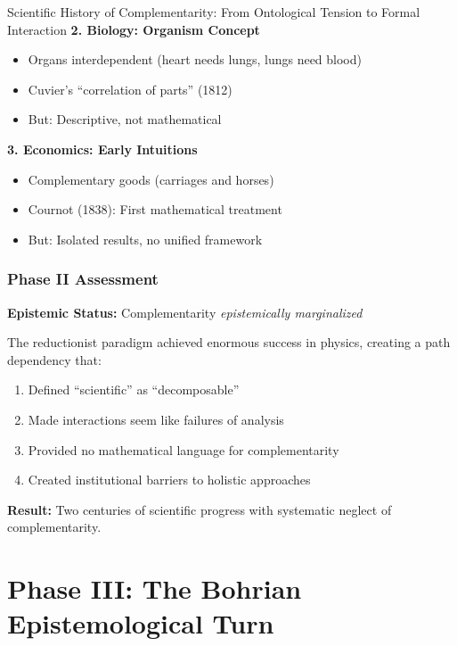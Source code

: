 \begin{chapter}{Scientific History of Complementarity: From Ontological Tension to Formal Interaction}
\textbf{2. Biology: Organism Concept}
\begin{itemize}[noitemsep]
    \item Organs interdependent (heart needs lungs, lungs need blood)
    \item Cuvier's ``correlation of parts'' (1812)
    \item But: Descriptive, not mathematical
\end{itemize}

\textbf{3. Economics: Early Intuitions}
\begin{itemize}[noitemsep]
    \item Complementary goods (carriages and horses)
    \item Cournot (1838): First mathematical treatment
    \item But: Isolated results, no unified framework
\end{itemize}

\subsubsection{Phase II Assessment}

\begin{tcolorbox}[colback=red!5!white,colframe=red!75!black,title=\textbf{Phase II Verdict}]
\textbf{Epistemic Status:} Complementarity \textit{epistemically marginalized}

The reductionist paradigm achieved enormous success in physics, creating a path dependency that:
\begin{enumerate}[noitemsep]
    \item Defined ``scientific'' as ``decomposable''
    \item Made interactions seem like failures of analysis
    \item Provided no mathematical language for complementarity
    \item Created institutional barriers to holistic approaches
\end{enumerate}

\textbf{Result:} Two centuries of scientific progress with systematic neglect of complementarity.
\end{tcolorbox}

\section{Phase III: The Bohrian Epistemological Turn}
\label{sec:phase-iii}


\end{chapter}
